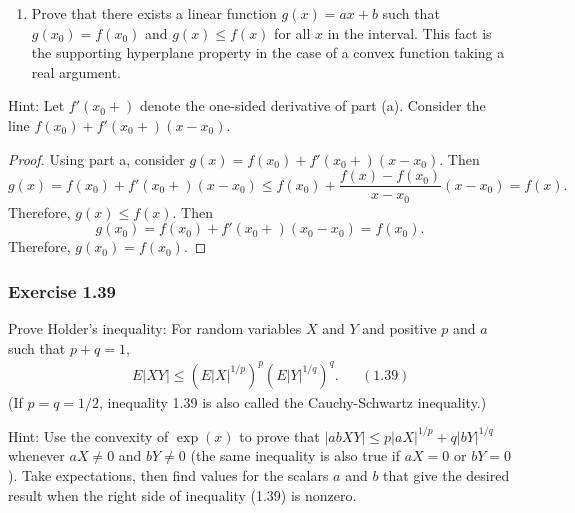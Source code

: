 \documentclass[12pt,]{article}
\providecommand{\tightlist}{%
  \setlength{\itemsep}{0pt}\setlength{\parskip}{0pt}}
\begin{document}
\begin{enumerate}
\def\labelenumi{(\alph{enumi})}
\setcounter{enumi}{1}
\tightlist
\item
  Prove that there exists a linear function \(g(x) = ax+b\) such that
  \(g(x_0) = f(x_0)\) and \(g(x) \le f(x)\) for all \(x\) in the
  interval. This fact is the supporting hyperplane property in the case
  of a convex function taking a real argument.
\end{enumerate}

Hint: Let \(f'(x_0+)\) denote the one-sided derivative of part (a).
Consider the line \(f(x_0)+f'(x_0+)(x-x_0).\)

\begin{proof}
Using part a, consider $g(x) = f(x_0)+f'(x_0+)(x-x_0)$. Then
$$g(x) = f(x_0)+f'(x_0+)(x-x_0) \le f(x_0)+\frac{f(x)-f(x_0)}{x-x_0}(x-x_0)=f(x).$$
Therefore, $g(x) \le f(x).$ Then
$$g(x_0) = f(x_0) + f'(x_0+)(x_0-x_0) = f(x_0).$$
Therefore, $g(x_0) = f(x_0)$.
\end{proof}

\hypertarget{exercise-1.39}{%
\subsubsection{Exercise 1.39}\label{exercise-1.39}}

Prove Holder's inequality: For random variables \(X\) and \(Y\) and
positive \(p\) and \(a\) such that \(p+q=1\), \begin{align*}
&& E|XY|\le (E|X|^{1/p})^p(E|Y|^{1/q})^q. && (1.39)
\end{align*} (If \(p=q=1/2\), inequality 1.39 is also called the
Cauchy-Schwartz inequality.)

Hint: Use the convexity of \(\exp(x)\) to prove that
\(|abXY|\le p|aX|^{1/p}+q|bY|^{1/q}\) whenever \(aX\ne 0\) and
\(bY \ne 0\) (the same inequality is also true if \(aX=0\) or \(bY=0\)).
Take expectations, then find values for the scalars \(a\) and \(b\) that
give the desired result when the right side of inequality (1.39) is
nonzero.
\end{document}
